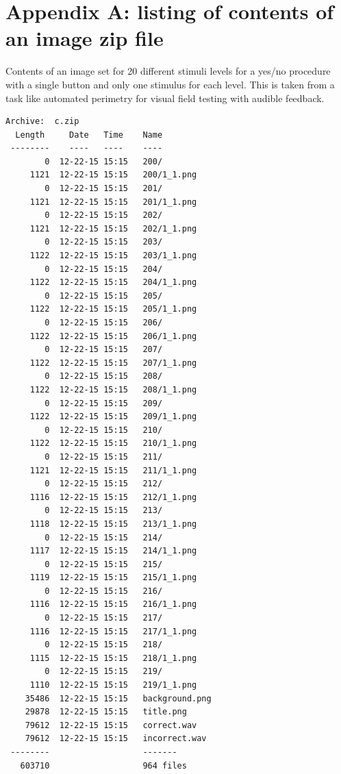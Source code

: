 \documentclass{article}
\begin{document}
\newpage

\appendix
\section{Appendix A: listing of contents of an image zip file}

Contents of an image set for 20 different stimuli levels for a yes/no
procedure with a single button and only one stimulus for each level.
This is taken from a task like automated perimetry for visual field
testing with audible feedback.


\begin{verbatim}
Archive:  c.zip
  Length     Date   Time    Name
 --------    ----   ----    ----
        0  12-22-15 15:15   200/
     1121  12-22-15 15:15   200/1_1.png
        0  12-22-15 15:15   201/
     1121  12-22-15 15:15   201/1_1.png
        0  12-22-15 15:15   202/
     1121  12-22-15 15:15   202/1_1.png
        0  12-22-15 15:15   203/
     1122  12-22-15 15:15   203/1_1.png
        0  12-22-15 15:15   204/
     1122  12-22-15 15:15   204/1_1.png
        0  12-22-15 15:15   205/
     1122  12-22-15 15:15   205/1_1.png
        0  12-22-15 15:15   206/
     1122  12-22-15 15:15   206/1_1.png
        0  12-22-15 15:15   207/
     1122  12-22-15 15:15   207/1_1.png
        0  12-22-15 15:15   208/
     1122  12-22-15 15:15   208/1_1.png
        0  12-22-15 15:15   209/
     1122  12-22-15 15:15   209/1_1.png
        0  12-22-15 15:15   210/
     1122  12-22-15 15:15   210/1_1.png
        0  12-22-15 15:15   211/
     1121  12-22-15 15:15   211/1_1.png
        0  12-22-15 15:15   212/
     1116  12-22-15 15:15   212/1_1.png
        0  12-22-15 15:15   213/
     1118  12-22-15 15:15   213/1_1.png
        0  12-22-15 15:15   214/
     1117  12-22-15 15:15   214/1_1.png
        0  12-22-15 15:15   215/
     1119  12-22-15 15:15   215/1_1.png
        0  12-22-15 15:15   216/
     1116  12-22-15 15:15   216/1_1.png
        0  12-22-15 15:15   217/
     1116  12-22-15 15:15   217/1_1.png
        0  12-22-15 15:15   218/
     1115  12-22-15 15:15   218/1_1.png
        0  12-22-15 15:15   219/
     1110  12-22-15 15:15   219/1_1.png
    35486  12-22-15 15:15   background.png
    29878  12-22-15 15:15   title.png
    79612  12-22-15 15:15   correct.wav
    79612  12-22-15 15:15   incorrect.wav
 --------                   -------
   603710                   964 files

\end{verbatim}

 
\end{document}
